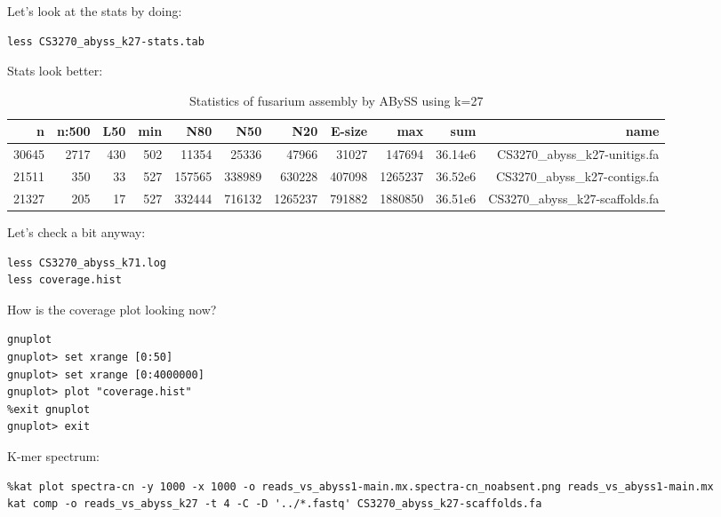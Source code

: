 \begin{steps}
Let's look at the stats by doing:
\begin{lstlisting}
less CS3270_abyss_k27-stats.tab
\end{lstlisting}
\end{steps}

Stats look better:
\begin{table}[H]
  \centering
  \caption{Statistics of fusarium assembly by ABySS using k=27}
    \begin{tabular}{rrrrrrrrrrr}
    \toprule
    \textbf{n} & \textbf{n:500} & \textbf{L50} & \textbf{min} & \textbf{N80}& \textbf{N50}& \textbf{N20}& \textbf{E-size}& \textbf{max} & \textbf{sum}& \textbf{name}\\
    \midrule
    30645  & 2717   & 430  & 502  & 11354   & 25336   & 47966    & 31027   & 147694   & 36.14e6  & CS3270\_abyss\_k27-unitigs.fa \\
	21511  & 350    & 33   & 527  & 157565  & 338989  & 630228   & 407098  & 1265237  & 36.52e6  & CS3270\_abyss\_k27-contigs.fa \\
	21327  & 205    & 17   & 527  & 332444  & 716132  & 1265237  & 791882  & 1880850  & 36.51e6  & CS3270\_abyss\_k27-scaffolds.fa \\
    \bottomrule
    \end{tabular}
  \label{tab:fusariumk27}
\end{table}

\begin{steps}
Let's check a bit anyway:
\begin{lstlisting}
less CS3270_abyss_k71.log
less coverage.hist
\end{lstlisting}
\end{steps}

\begin{steps}
How is the coverage plot looking now?
\begin{lstlisting}
gnuplot
gnuplot> set xrange [0:50]
gnuplot> set xrange [0:4000000]
gnuplot> plot "coverage.hist"
%exit gnuplot
gnuplot> exit
\end{lstlisting}
\end{steps}

\begin{steps}
K-mer spectrum:
\begin{lstlisting}
%kat plot spectra-cn -y 1000 -x 1000 -o reads_vs_abyss1-main.mx.spectra-cn_noabsent.png reads_vs_abyss1-main.mx
kat comp -o reads_vs_abyss_k27 -t 4 -C -D '../*.fastq' CS3270_abyss_k27-scaffolds.fa
\end{lstlisting}
\end{steps}


